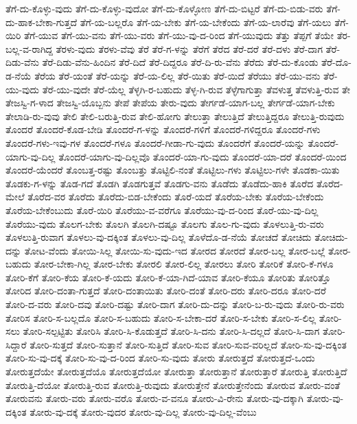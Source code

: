 {ತೆಗೆ-ದು-ಕೊಳ್ಳು-ವುದು
ತೆಗೆ-ದು-ಕೊಳ್ಳು-ವುದೋ
ತೆಗೆ-ದು-ಕೊಳ್ಳೋಣ
ತೆಗೆ-ದು-ಬಿಟ್ಟರೆ
ತೆಗೆ-ದು-ಬಿಡು-ವರು
ತೆಗೆ-ದು-ಹಾಕ-ಬೇಕಾ-ಗುತ್ತದೆ
ತೆಗೆ-ಯ-ಬಲ್ಲರೊ
ತೆಗೆ-ಯ-ಬೇಕು
ತೆಗೆ-ಯ-ಬೇಕೆಂದು
ತೆಗೆ-ಯ-ಲಾರೆವು
ತೆಗೆ-ಯಲು
ತೆಗೆ-ಯಿರಿ
ತೆಗೆ-ಯುವ
ತೆಗೆ-ಯು-ವನು
ತೆಗೆ-ಯು-ವರು
ತೆಗೆ-ಯು-ವು-ದ-ರಿಂದ
ತೆಗೆ-ಯುವುದು
ತೆತ್ತು
ತೆಪ್ಪಗೆ
ತೆಯೇ
ತೆರ-ಬಲ್ಲ-ವ-ರಾಗಿದ್ದ
ತೆರಳು-ವುದು
ತೆರಳು-ವೆವು
ತೆರೆ
ತೆರೆ-ಗ-ಳನ್ನು
ತೆರೆಗೆ
ತೆರೆದ
ತೆರೆ-ದರೆ
ತೆರೆ-ದಳು
ತೆರೆ-ದಾಗ
ತೆರೆ-ದಿಡು-ವೆನು
ತೆರೆ-ದಿಡು-ವೆನು-ಹಿಂದಿನ
ತೆರೆ-ದಿದೆ
ತೆರೆ-ದಿದ್ದರೂ
ತೆರೆ-ದಿ-ರು-ವೆನು
ತೆರೆದು
ತೆರೆ-ದು-ಕೊಂಡು
ತೆರೆ-ದೊ-ಡ-ನೆಯೆ
ತೆರೆಯ
ತೆರೆ-ಯಂತೆ
ತೆರೆ-ಯನ್ನು
ತೆರೆ-ಯ-ಲಿಲ್ಲ
ತೆರೆ-ಯಿತು
ತೆರೆ-ಯಿದೆ
ತೆರೆಯು
ತೆರೆ-ಯು-ವನು
ತೆರೆ-ಯು-ವುದು
ತೆರೆ-ಯು-ವುದೇ
ತೆರೆ-ಯೆಲ್ಲ
ತೆಳ್ಳಗಿ-ರ-ಬಹುದು
ತೆಳ್ಳ-ಗಿ-ರುವ
ತೆಳ್ಳೆಗಾಗುತ್ತಾ
ತೆವಳುತ್ತ
ತೆವಳುತ್ತಿ-ರುವ
ತೇ
ತೇಜಸ್ವಿ-ಗ-ಳಾದ
ತೇಜಸ್ವಿ-ಯೊಬ್ಬನು
ತೇಪೆ
ತೇಪೆಯ
ತೇರು-ವುದು
ತೇರ್ಗಡೆ-ಯಾಗ-ಬಲ್ಲ
ತೇರ್ಗಡೆ-ಯಾಗ-ಬೇಕು
ತೇಲಾಡಿ-ರು-ವುವು
ತೇಲಿ
ತೇಲಿ-ಬರುತ್ತಿ-ರುವ
ತೇಲಿ-ಹೋಗು
ತೇಲುತ್ತಾ
ತೇಲುತ್ತಿದೆ
ತೇಲುತ್ತಿದ್ದರೂ
ತೇಲುತ್ತಿ-ರುವುದು
ತೊಂದರೆ
ತೊಂದರೆ-ಕೊಡ-ಬೇಡಿ
ತೊಂದರೆ-ಗ-ಳನ್ನು
ತೊಂದರೆ-ಗಳಿಗೆ
ತೊಂದರೆ-ಗಳಿದ್ದರೂ
ತೊಂದರೆ-ಗಳು
ತೊಂದರೆ-ಗಳು-ಇವು-ಗಳ
ತೊಂದರೆ-ಗಳೂ
ತೊಂದರೆ-ಗೀಡಾ-ಗು-ವುದು
ತೊಂದರೆಗೆ
ತೊಂದರೆ-ಯನ್ನು
ತೊಂದರೆ-ಯಾಗು-ವು-ದಿಲ್ಲ
ತೊಂದರೆ-ಯಾಗು-ವು-ದಿಲ್ಲವೊ
ತೊಂದರೆ-ಯಾ-ಗು-ವುದು
ತೊಂದರೆ-ಯಾ-ದರೆ
ತೊಂದರೆ-ಯಿಂದ
ತೊಂದರೆ-ಯೆಂದರೆ
ತೊಂಬತ್ತ-ರಷ್ಟು
ತೊಂಬತ್ತು
ತೊಟ್ಟಿಲಿ-ನಂತೆ
ತೊಟ್ಟಿಲು-ಗಳು
ತೊಟ್ಟಿಲು-ಗಳೇ
ತೊಡಕಾ-ಯಿತು
ತೊಡಕು-ಗ-ಳನ್ನು
ತೊಡ-ಗದೆ
ತೊಡಗಿ
ತೊಡಗುತ್ತವೆ
ತೊಡಗು-ವನು
ತೊಡೆದು
ತೊಡೆದು-ಹಾಕಿ
ತೊರೆದ
ತೊರೆದ-ಮೇಲೆ
ತೊರೆದ-ವರ
ತೊರೆದು
ತೊರೆದು-ಬಿಡ-ಬೇಕೆಂದು
ತೊರೆ-ಯದೆ
ತೊರೆಯ-ಬೇಕು
ತೊರೆಯ-ಬೇಕೆಂದು
ತೊರೆಯ-ಬೇಕೆಂಬುದು
ತೊರೆ-ಯಿರಿ
ತೊರೆಯು-ವ-ವರೆಗೂ
ತೊರೆಯು-ವು-ದ-ರಿಂದ
ತೊರೆ-ಯು-ವು-ದಿಲ್ಲ
ತೊರೆಯು-ವುದು
ತೊಲಗ-ಬೇಕು
ತೊಲಗಿ
ತೊಲಗಿ-ದಷ್ಟೂ
ತೊಲಗು
ತೊಲ-ಗು-ವುದು
ತೊಳಲುತ್ತಿ-ರು-ವರು
ತೊಳಲುತ್ತಿ-ರುವಾಗ
ತೊಳಲು-ವು-ದಕ್ಕಿಂತ
ತೊಳಲು-ವು-ದಿಲ್ಲ
ತೊಳೆದೊ-ಡ-ನೆಯೆ
ತೋಚದೆ
ತೋಚಿದು
ತೋಚಿದು-ದನ್ನು
ತೋಟ-ವೆಂದು
ತೋಯಿ-ಸಿಲ್ಲ
ತೋಯಿ-ಸು-ವುದು-ಇದ
ತೋರದ
ತೋರದೆ
ತೋರ-ಬಲ್ಲ
ತೋರ-ಬಲ್ಲೆ
ತೋರ-ಬಹುದು
ತೋರ-ಬೇಕಾ-ಗಿಲ್ಲ
ತೋರ-ಬೇಕು
ತೋರಲಿ
ತೋರ-ಲಿಲ್ಲ
ತೋರಲು
ತೋರಿ
ತೋರಿಕೆ
ತೋರಿ-ಕೆ-ಗಳೂ
ತೋರಿ-ಕೆಗೆ
ತೋರಿ-ಕೆಯ
ತೋರಿ-ಕೆ-ಯದು
ತೋರಿ-ಕೆ-ಯಾ-ಗಿದೆ-ಯಾವ
ತೋರಿ-ಕೆಯೂ
ತೋರಿತು
ತೋರಿತ್ತೊ
ತೋರಿದ
ತೋರಿ-ದಂತಾ-ಗುತ್ತದೆ
ತೋರಿ-ದಂತಾಯಿತು
ತೋರಿ-ದಂತೆ
ತೋರಿ-ದರು
ತೋರಿ-ದರೂ
ತೋರಿ-ದರೆ
ತೋರಿ-ದ-ವರು
ತೋರಿ-ದವು
ತೋರಿ-ದಷ್ಟು
ತೋರಿ-ದಾಗ
ತೋರಿ-ದು-ದನ್ನು
ತೋರಿ-ಬ-ರು-ವುದು
ತೋರಿ-ರು-ವರು
ತೋರಿಸ
ತೋರಿ-ಸ-ಬಲ್ಲದೊ
ತೋರಿ-ಸ-ಬಹುದು
ತೋರಿ-ಸ-ಬೇಕಾ-ದರೆ
ತೋರಿ-ಸ-ಬೇಕು
ತೋರಿ-ಸ-ಲಿಲ್ಲ
ತೋರಿ-ಸಲು
ತೋರಿ-ಸಲ್ಪಟ್ಟಿತು
ತೋರಿಸಿ
ತೋರಿ-ಸಿ-ಕೊಡುತ್ತದೆ
ತೋರಿ-ಸಿ-ದನು
ತೋರಿ-ಸಿ-ದಲ್ಲದೆ
ತೋರಿ-ಸಿ-ದಾಗ
ತೋರಿ-ಸಿದ್ದಾರೆ
ತೋರಿ-ಸುತ್ತದೆ
ತೋರಿ-ಸುತ್ತಾನೆ
ತೋರಿ-ಸುತ್ತಿದೆ
ತೋರಿ-ಸುವ
ತೋರಿ-ಸುವ-ವರಿಲ್ಲದೆ
ತೋರಿ-ಸು-ವು-ದಕ್ಕಿಂತ
ತೋರಿ-ಸು-ವು-ದಕ್ಕೆ
ತೋರಿ-ಸು-ವು-ದ-ರಿಂದ
ತೋರಿ-ಸು-ವುದು
ತೋರು
ತೋರುತ್ತದೆ
ತೋರುತ್ತದೆ-ಒಂದು
ತೋರುತ್ತದೆಯೇ
ತೋರುತ್ತದೆಯೊ
ತೋರುತ್ತದೆಯೋ
ತೋರುತ್ತಾ
ತೋರುತ್ತಾನೆ
ತೋರುತ್ತಾರೆ
ತೋರುತ್ತಿ
ತೋರುತ್ತಿದೆ
ತೋರುತ್ತಿ-ದೆಯೋ
ತೋರುತ್ತಿ-ರುವ
ತೋರುತ್ತಿ-ರುವುದು
ತೋರುತ್ತೇನೆ
ತೋರುತ್ತೇನೆಂದು
ತೋರುವ
ತೋರು-ವಂತೆ
ತೋರುವನು
ತೋರು-ವರು
ತೋರು-ವರೊ
ತೋರು-ವ-ವನೂ
ತೋರು-ವಿ-ರೇನು
ತೋರು-ವು-ದಕ್ಕಾಗಿ
ತೋರು-ವು-ದಕ್ಕಿಂತ
ತೋರು-ವು-ದಕ್ಕೆ
ತೋರು-ವುದರ
ತೋರು-ವು-ದಿಲ್ಲ
ತೋರು-ವು-ದಿಲ್ಲ-ವೆಂಬು
}
